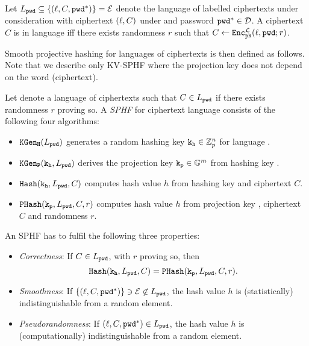
\begin{definition}\label{def:language}
Let $L_\mathtt{pwd} \subseteq \{(\ell, C, \mathtt{pwd}^\ast)\}=\mathcal{E}$ denote the language of labelled ciphertexts under consideration with ciphertext $(\ell,C)$ under \pk and password $\mathtt{pwd}^\ast\in\mathcal{D}$.
A ciphertext $C$ is in language \Lpwd iff there exists randomness $r$ such that $C\gets\mathtt{Enc}^{\mathcal{L}}_\mathtt{pk}(\ell,\mathtt{pwd};r)$.
\eod
\end{definition}

\noindent
Smooth projective hashing for languages of ciphertexts is then defined as follows.
Note that we describe only KV-SPHF where the projection key does not depend on the word (ciphertext).

\begin{definition}[KV-SPHF]\label{def:sphf}
Let \Lpwd denote a language of ciphertexts such that $C\in L_\mathtt{pwd}$ if there exists randomness $r$ proving so.
A \emph{\acl{SPHF}} for ciphertext language \Lpwd consists of the following four algorithms:

\begin{itemize}
	\item $\mathtt{KGen_H}(L_\mathtt{pwd})$ generates a random hashing key $\mathtt{k_h}\in\mathbb{Z}_p^n$ for language \Lpwd.
	\item $\mathtt{KGen_P}(\mathtt{k_h},L_\mathtt{pwd})$ derives the projection key $\mathtt{k_p}\in\mathbb{G}^m$ from hashing key \hk. 
	\item $\mathtt{Hash}(\mathtt{k_h},L_\mathtt{pwd},C)$ computes hash value $h$ from hashing key \hk and ciphertext $C$.
	\item $\mathtt{PHash}(\mathtt{k_p},L_\mathtt{pwd},C,r)$ computes hash value $h$ from projection key \hp, ciphertext $C$ and randomness $r$. \eod
\end{itemize}
\end{definition}

\noindent
An \ac{SPHF} has to fulfil the following three properties:
\begin{itemize}
	\item \emph{Correctness}: If $C\in L_\mathtt{pwd}$, with $r$ proving so, then \[\mathtt{Hash}(\mathtt{k_h},L_\mathtt{pwd},C)=\mathtt{PHash}(\mathtt{k_p},L_\mathtt{pwd},C,r).\]
	\item \emph{Smoothness}: If $\{(\ell, C, \mathtt{pwd}^\ast)\}\ni \mathcal{E}\not\in L_\mathtt{pwd}$, the hash value $h$ is (statistically) indistinguishable from a random element. 
	\item \emph{Pseudorandomness}: If $(\ell, C, \mathtt{pwd}^\ast)\in L_\mathtt{pwd}$, the hash value $h$ is (computationally) indistinguishable from a random element. 
\end{itemize}

